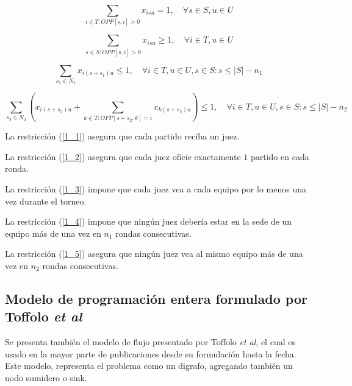 \documentclass[letter, 10pt]{article}
\begin{document}
\begin{equation} \label{1_2}
  \displaystyle\sum_{i \in T:OPP[s, i] > 0} x_{isu} = 1, \quad\forall s \in S, u \in U
\end{equation}

\begin{equation} \label{1_3}
  \displaystyle\sum_{s \in S:OPP[s, i] > 0} x_{isu} \geq 1, \quad\forall i \in T, u \in U
\end{equation}

\begin{equation} \label{1_4}
  \displaystyle\sum_{s_1 \in N_1} x_{i(s+s_1)u} \leq 1, \quad\forall i \in T, u \in U, s \in S:s \leq |S| - n_1
\end{equation}

\begin{equation} \label{1_5}
  \displaystyle\sum_{s_2 \in N_2}\left(x_{i(s+s_2)u} + \displaystyle\sum_{k \in T:OPP\left[s+s_2, k\right]=i} x_{k(s+s_2)u}  \right) \leq 1, \quad\forall i \in T, u \in U, s \in S:s \leq |S| - n_2
\end{equation}


La restricci\'on (\ref{1_1}) asegura que cada partido reciba un juez.

La restricci\'on (\ref{1_2}) asegura que cada juez oficie exactamente $1$ partido en cada ronda.

La restricci\'on (\ref{1_3}) impone que cada juez vea a cada equipo por lo menos una vez durante el torneo.

La restricci\'on (\ref{1_4}) impone que ning\'un juez deber\'ia estar en la sede de un equipo m\'as de una vez en $n_1$ rondas consecutivas.

La restricci\'on (\ref{1_5}) asegura que ning\'un juez vea al mismo equipo m\'as de una vez en $n_2$ rondas consecutivas.

\subsection{Modelo de programaci\'on entera formulado por Toffolo \emph{et al}}
Se presenta tambi\'en el modelo de flujo presentado por Toffolo \emph{et al}\cite{TOFFOLO2016737}, el cual es usado en la mayor parte de publicaciones desde su formulaci\'on hasta la fecha. Este modelo, representa el problema como un digrafo, agregando tambi\'en un nodo sumidero o sink.
\end{document}
